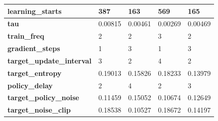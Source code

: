 \documentclass[../xlapes02]{subfiles}
\begin{document}
\begin{table}[h!]
{\begin{tabular}{|l||l|l||l|l|}
                \textbf{learning\_starts}          & 387                                          & 163                                          & 569                                          & 165                                          \\ \hline
                \textbf{tau}                       & 0.00815                                      & 0.00461                                      & 0.00269                                      & 0.00469                                      \\ \hline
                \textbf{train\_freq}               & 2                                            & 2                                            & 3                                            & 2                                            \\ \hline
                \textbf{gradient\_steps}           & 1                                            & 3                                            & 1                                            & 3                                            \\ \hline
                \textbf{target\_update\_interval}  & 3                                            & 2                                            & 4                                            & 2                                            \\ \hline
                \textbf{target\_entropy}           & 0.19013                                      & 0.15826                                      & 0.18233                                      & 0.13979                                      \\ \hline
                \textbf{policy\_delay}             & 2                                            & 4                                            & 2                                            & 3                                            \\ \hline
                \textbf{target\_policy\_noise}     & 0.11459                                      & 0.15052                                      & 0.10674                                      & 0.12649                                      \\ \hline
                \textbf{target\_noise\_clip}       & 0.18538                                      & 0.10527                                      & 0.18672                                      & 0.14197                                      \\ \hline

\end{tabular}}
\end{table}
\end{document}

